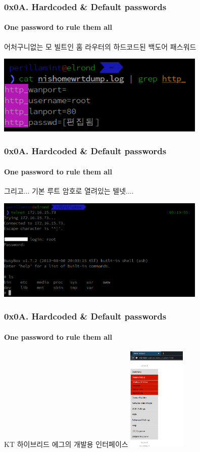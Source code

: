 \documentclass {beamer}
\begin{document}
\begin{frame}
  \frametitle{0x0A. Hardcoded \& Default passwords}
  \framesubtitle{One password to rule them all}

  \begin{center}
    어처구니없는 모 빌트인 홈 라우터의 하드코드된 백도어 패스워드

    \includegraphics [width=100mm]{img/homeap_nvram.png}
  \end{center}
\end{frame}

\begin{frame}
  \frametitle{0x0A. Hardcoded \& Default passwords}
  \framesubtitle{One password to rule them all}

  \begin{center}
    그리고... 기본 루트 암호로 열려있는 텔넷....

    \includegraphics [width=100mm]{img/homeap_telnet.png}
  \end{center}
\end{frame}

\begin{frame}
  \frametitle{0x0A. Hardcoded \& Default passwords}
  \framesubtitle{One password to rule them all}

  \begin{center}
    KT 하이브리드 에그의 개발용 인터페이스
    \linebreak
    \includegraphics [height=50mm]{img/hybridegg.png}
  \end{center}
\end{frame}
\end{document}
